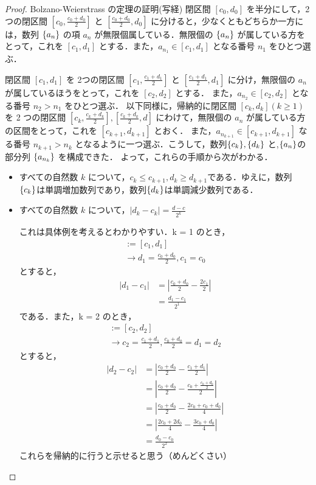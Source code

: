 \documentclass[xelatex,ja=standard,jafont=noto]{bxjsarticle}
\begin{document}
   \begin{proof}{Bolzano-Weierstrass の定理の証明(写経)}{}
    閉区間 $[c_0, d_0]$ を半分にして，2つの閉区間 $[c_0, \frac{c_0 + d_0}{2}]$ と $[\frac{c_0 + d_0}{2}, d_0]$ に分けると，少なくともどちらか一方には，数列 $\{a_n\}$ の項 $a_n$ が無限個属している．無限個の $\{a_n\}$ が属している方をとって，これを $[c_1, d_1]$ とする．また，$a_{n_1} \in [c_1, d_1]$ となる番号 $n_1$ をひとつ選ぶ．

    閉区間 $[c_1, d_1]$ を 2つの閉区間 $[c_1, \frac{c_1 + d_1}{2}]$ と $[\frac{c_1 + d_1}{2}, d_1]$ に分け，無限個の $a_n$ が属しているほうをとって，これを $[c_2, d_2]$ とする．
    また，$a_{n_2} \in [c_2, d_2]$ となる番号 $n_2 > n_1$ をひとつ選ぶ．
    以下同様に，帰納的に閉区間 $[c_k, d_k] (k \geq 1)$ を 2 つの閉区間 $[c_k, \frac{c_k + d_k}{2}], [\frac{c_k + d_k}{2}, d]$ にわけて，無限個の $a_n$ が属している方の区間をとって，これを $[c_{k + 1}, d_{k + 1}]$ とおく．
    また，$a_{n_{k + 1}} \in [c_{k+1}, d_{k+1}]$ なる番号 $n_{k+1} > n_k$ となるように一つ選ぶ．こうして，数列$\{c_k\}, \{d_k\}$ と,$ \{a_n\}$の部分列 $\{a_{n_k}\}$ を構成できた．
    よって，これらの手順から次がわかる．
    \begin{itemize}
      \item すべての自然数 $k$ について，$c_k \leq c_{k+1}, d_{k} \geq d_{k+1}$である．ゆえに，数列 $\{c_k\}$は単調増加数列であり，数列$\{d_k\}$は単調減少数列である．
      \item すべての自然数 $k$ について，$|d_k - c_k| = \frac{d-c}{2^k}$

      これは具体例を考えるとわかりやすい．k = 1 のとき，
      \begin{align}
        [c_0, \frac{c_0 + d_0}{2}]:= [c_1, d_1] \\
        \longrightarrow d_1 = \frac{c_0 + d_0}{2}, c_1 = c_0
      \end{align}
      とすると，
      \begin{align}
        |d_1 - c_1| &= |\frac{c_0 + d_0}{2} - \frac{2c_1}{2}| \\
        &= \frac{d_1 - c_1}{2^1}
      \end{align}
      である．また，k = 2 のとき，
      \begin{align}
        [\frac{c_1 + d_1}{2}, d_1]:= [c_2, d_2] \\
        \longrightarrow c_2 = \frac{c_1 + d_1}{2}, \frac{c_0 + d_0}{2} = d_1 = d_2
      \end{align}
      とすると，
      \begin{align}
        |d_2 - c_2| &= |\frac{c_0 + d_0}{2} - \frac{c_1 + d_1}{2}| \\
        &= |\frac{c_0 + d_0}{2} - \frac{c_0 + \frac{c_0 + d_0}{2}}{2}| \\
        &= |\frac{c_0 + d_0}{2} - \frac{2c_0 + c_0 + d_0}{4}| \\
        &= |\frac{2c_0 + 2d_0}{4} - \frac{3c_0 + d_0}{4}| \\
        &= \frac{d_0 - c_0}{2^2}
      \end{align}
      これらを帰納的に行うと示せると思う（めんどくさい）


\end{itemize}
\end{proof}
\end{document}
